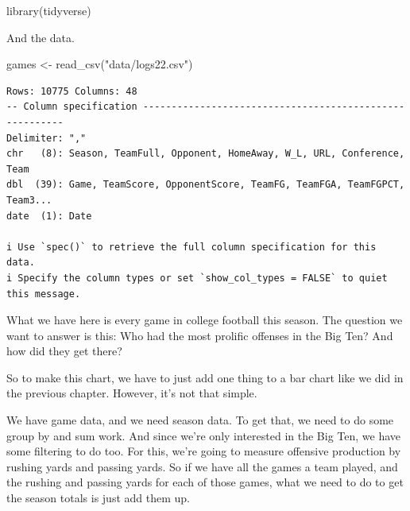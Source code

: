 \documentclass[
  letterpaper,
  DIV=11,
  numbers=noendperiod]{scrreprt}
\newenvironment{Shaded}{\begin{snugshade}}{\end{snugshade}}
\newcommand{\FunctionTok}[1]{\textcolor[rgb]{0.28,0.35,0.67}{#1}}
\newcommand{\NormalTok}[1]{\textcolor[rgb]{0.00,0.23,0.31}{#1}}
\newcommand{\OtherTok}[1]{\textcolor[rgb]{0.00,0.23,0.31}{#1}}
\newcommand{\StringTok}[1]{\textcolor[rgb]{0.13,0.47,0.30}{#1}}
\begin{document}
\begin{Shaded}
\begin{Highlighting}[]
\FunctionTok{library}\NormalTok{(tidyverse)}
\end{Highlighting}
\end{Shaded}

And the data.

\begin{Shaded}
\begin{Highlighting}[]
\NormalTok{games }\OtherTok{\textless{}{-}} \FunctionTok{read\_csv}\NormalTok{(}\StringTok{"data/logs22.csv"}\NormalTok{)}
\end{Highlighting}
\end{Shaded}

\begin{verbatim}
Rows: 10775 Columns: 48
-- Column specification --------------------------------------------------------
Delimiter: ","
chr   (8): Season, TeamFull, Opponent, HomeAway, W_L, URL, Conference, Team
dbl  (39): Game, TeamScore, OpponentScore, TeamFG, TeamFGA, TeamFGPCT, Team3...
date  (1): Date

i Use `spec()` to retrieve the full column specification for this data.
i Specify the column types or set `show_col_types = FALSE` to quiet this message.
\end{verbatim}

What we have here is every game in college football this season. The
question we want to answer is this: Who had the most prolific offenses
in the Big Ten? And how did they get there?

So to make this chart, we have to just add one thing to a bar chart like
we did in the previous chapter. However, it's not that simple.

We have game data, and we need season data. To get that, we need to do
some group by and sum work. And since we're only interested in the Big
Ten, we have some filtering to do too. For this, we're going to measure
offensive production by rushing yards and passing yards. So if we have
all the games a team played, and the rushing and passing yards for each
of those games, what we need to do to get the season totals is just add
them up.
\end{document}
